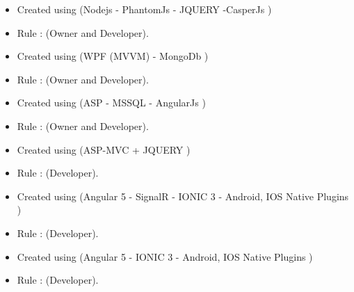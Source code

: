 
\clearpage
   \begin{itemize}
\item Created using (Nodejs - PhantomJs - JQUERY -CasperJs ) 
\item Rule : (Owner and Developer). 
\end{itemize}
 \divider

   \begin{itemize}
\item Created using (WPF (MVVM) - MongoDb ) 
\item Rule : (Owner and Developer). 
\end{itemize}

 \divider
{}
  \begin{itemize}
\item Created using (ASP - MSSQL - AngularJs ) 
\item Rule : (Owner and Developer). 
\end{itemize}

 \divider
{}
  \begin{itemize}
\item Created using (ASP-MVC + JQUERY ) 
\item Rule : (Developer). 
\end{itemize}
 \divider
 
  \begin{itemize}
\item Created using (Angular 5 - SignalR - IONIC 3 - Android, IOS Native Plugins ) 
\item Rule : (Developer). 
\end{itemize}
 \divider


\begin{itemize}
\item Created using (Angular 5  - IONIC 3 - Android, IOS Native Plugins ) 
\item Rule : (Developer). 
\end{itemize}
\divider
\divider
 
